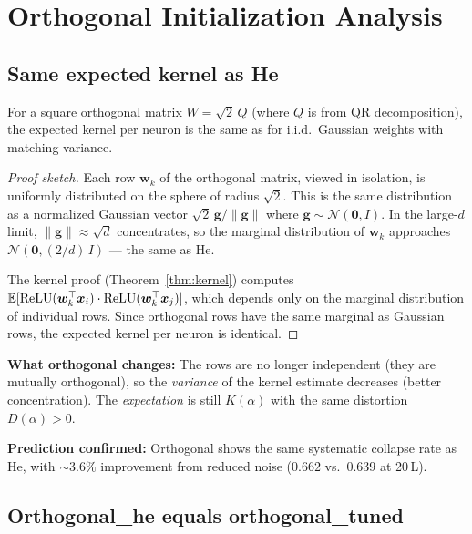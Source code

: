 \section{Orthogonal Initialization Analysis}
\label{sec:orthogonal_analysis}

\subsection{Same expected kernel as He}

\begin{proposition}
For a square orthogonal matrix $W = \sqrt{2}\,Q$ (where $Q$ is from QR
decomposition), the expected kernel per neuron is the same as for
i.i.d.\ Gaussian weights with matching variance.
\end{proposition}

\begin{proof}[Proof sketch]
Each row $\bm{w}_k$ of the orthogonal matrix, viewed in isolation,
is uniformly distributed on the sphere of radius $\sqrt{2}$.
This is the same distribution as a normalized Gaussian vector
$\sqrt{2}\,\bm{g}/\|\bm{g}\|$ where $\bm{g} \sim \mathcal{N}(\bm{0}, I)$.
In the large-$d$ limit, $\|\bm{g}\| \approx \sqrt{d}$ concentrates, so
the marginal distribution of $\bm{w}_k$ approaches
$\mathcal{N}(\bm{0}, (2/d)\,I)$ --- the same as He.

The kernel proof (Theorem~\ref{thm:kernel}) computes
$\mathbb{E}[\operatorname{ReLU}(\bm{w}_k^\top \bm{x}_i) \cdot \operatorname{ReLU}(\bm{w}_k^\top \bm{x}_j)]$,
which depends only on the marginal distribution of individual rows.
Since orthogonal rows have the same marginal as Gaussian rows, the
expected kernel per neuron is identical.
\end{proof}

\textbf{What orthogonal changes:} The rows are no longer independent
(they are mutually orthogonal), so the \emph{variance} of the kernel
estimate decreases (better concentration).  The \emph{expectation} is
still $K(\alpha)$ with the same distortion $D(\alpha) > 0$.

\textbf{Prediction confirmed:} Orthogonal shows the same systematic
collapse rate as He, with ${\sim}3.6\%$ improvement from reduced noise
($0.662$ vs.\ $0.639$ at 20\,L).

\subsection{Orthogonal\_he equals orthogonal\_tuned}

